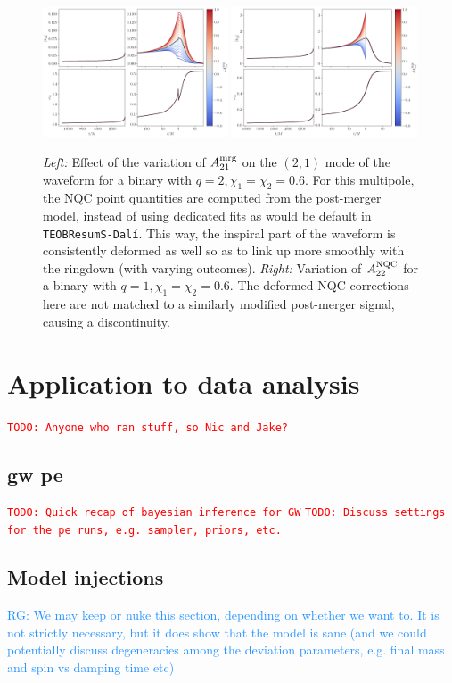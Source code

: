 \documentclass[prd,amssymb,amsmath,amsfonts,nofootinbib,reprint,showpacs,longbibliography]{revtex4-1}
\newcommand{\RG}[1]{{\textcolor{dodgerblue}{{RG: #1}} }}
\newcommand{\todo}[1]{\textcolor{red}{\texttt{TODO: #1}}}
\newcommand{\amrg}[1]{{A_{#1}^{\rm mrg}}}
\newcommand{\anqc}[1]{{A_{#1}^{\rm NQC}}}
\newcommand{\dali}[0]{\texttt{TEOBResumS-Dalí}}
\begin{document}
\begin{figure}
    \includegraphics[width=0.49\textwidth]{figs/delta_A21_mrg_-0.8_1.0.png}
    \includegraphics[width=0.49\textwidth]{figs/delta_A22_nqc_-0.8_1.0.png}
    \caption{\label{fig:bad_dev_mrgnqc}
    \textit{Left:} Effect of the variation of $\amrg{21}$ on the $(2,1)$ mode of the waveform
    for a binary with $q = 2, \chi_1 = \chi_2 = 0.6$.
    For this multipole, the NQC point quantities are computed from the post-merger model, instead of using
    dedicated fits as would be default in \dali. This way, the inspiral part of the waveform is
    consistently deformed as well so as to link up more smoothly with the ringdown (with varying outcomes).
    \textit{Right:} Variation of $\anqc{22}$ for a binary with $q = 1, \chi_1 = \chi_2 = 0.6$. The
    deformed NQC corrections here are not matched to a similarly modified post-merger signal, causing a discontinuity.}
\end{figure}

\section{Application to data analysis}
\todo{Anyone who ran stuff, so Nic and Jake? }

\subsection{\ac{gw} \ac{pe}}
\todo{Quick recap of bayesian inference for GW}
\todo{Discuss settings for the \ac{pe} runs, e.g. sampler, priors, etc.}

\subsection{Model injections}
\RG{We may keep or nuke this section, depending on whether we want to. It is not strictly necessary,
but it does show that the model is sane (and we could potentially discuss degeneracies among the deviation parameters,
e.g. final mass and spin vs damping time etc)}
\end{document}
